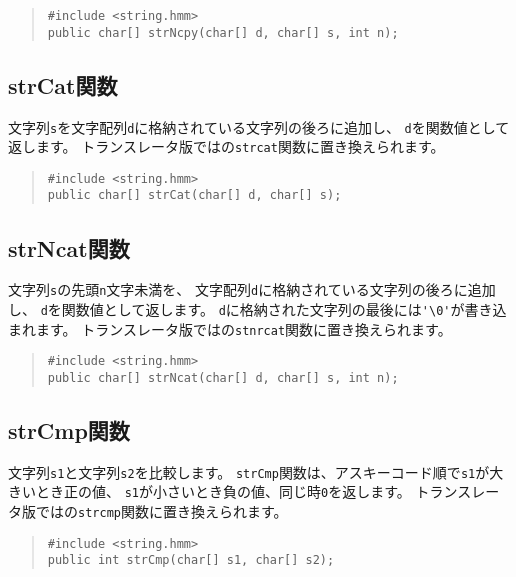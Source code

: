 \begin{quote}
\begin{verbatim}
#include <string.hmm>
public char[] strNcpy(char[] d, char[] s, int n);
\end{verbatim}
\end{quote}

\subsection{strCat関数}

文字列\verb/s/を文字配列\verb/d/に格納されている文字列の後ろに追加し、
\verb/d/を関数値として返します。
トランスレータ版では\cl の\verb/strcat/関数に置き換えられます。

\begin{quote}
\begin{verbatim}
#include <string.hmm>
public char[] strCat(char[] d, char[] s);
\end{verbatim}
\end{quote}

\subsection{strNcat関数}

文字列\verb/s/の先頭\verb/n/文字未満を、
文字配列\verb/d/に格納されている文字列の後ろに追加し、
\verb/d/を関数値として返します。
\verb/d/に格納された文字列の最後には\verb/'\0'/が書き込まれます。
トランスレータ版では\cl の\verb/stnrcat/関数に置き換えられます。

\begin{quote}
\begin{verbatim}
#include <string.hmm>
public char[] strNcat(char[] d, char[] s, int n);
\end{verbatim}
\end{quote}

\subsection{strCmp関数}

文字列\verb/s1/と文字列\verb/s2/を比較します。
\verb/strCmp/関数は、アスキーコード順で\verb/s1/が大きいとき正の値、
\verb/s1/が小さいとき負の値、同じ時\verb/0/を返します。
トランスレータ版では\cl の\verb/strcmp/関数に置き換えられます。

\begin{quote}
\begin{verbatim}
#include <string.hmm>
public int strCmp(char[] s1, char[] s2);
\end{verbatim}
\end{quote}

